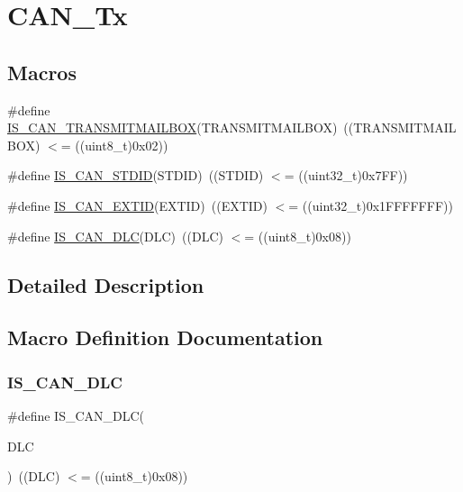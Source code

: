 \hypertarget{group___c_a_n___tx}{}\section{C\+A\+N\+\_\+\+Tx}
\label{group___c_a_n___tx}
\subsection*{Macros}
\begin{DoxyCompactItemize}
\item 
\#define \mbox{\hyperlink{group___c_a_n___tx_ga218b3e1380c4d49163c91a1af904e44c}{I\+S\+\_\+\+C\+A\+N\+\_\+\+T\+R\+A\+N\+S\+M\+I\+T\+M\+A\+I\+L\+B\+OX}}(T\+R\+A\+N\+S\+M\+I\+T\+M\+A\+I\+L\+B\+OX)~((T\+R\+A\+N\+S\+M\+I\+T\+M\+A\+I\+L\+B\+OX) $<$= ((uint8\+\_\+t)0x02))
\item 
\#define \mbox{\hyperlink{group___c_a_n___tx_gaf059e4383fa69dec6e18216b22a87f51}{I\+S\+\_\+\+C\+A\+N\+\_\+\+S\+T\+D\+ID}}(S\+T\+D\+ID)~((S\+T\+D\+ID) $<$= ((uint32\+\_\+t)0x7\+F\+F))
\item 
\#define \mbox{\hyperlink{group___c_a_n___tx_ga62dbc2163ad6751b3f921e717b00e9f2}{I\+S\+\_\+\+C\+A\+N\+\_\+\+E\+X\+T\+ID}}(E\+X\+T\+ID)~((E\+X\+T\+ID) $<$= ((uint32\+\_\+t)0x1\+F\+F\+F\+F\+F\+F\+F))
\item 
\#define \mbox{\hyperlink{group___c_a_n___tx_ga6109469a6a2792b3e7c6be520ea50d36}{I\+S\+\_\+\+C\+A\+N\+\_\+\+D\+LC}}(D\+LC)~((D\+LC) $<$= ((uint8\+\_\+t)0x08))
\end{DoxyCompactItemize}


\subsection{Detailed Description}


\subsection{Macro Definition Documentation}
\mbox{\label{group___c_a_n___tx_ga6109469a6a2792b3e7c6be520ea50d36}} 
\subsubsection{\texorpdfstring{IS\_CAN\_DLC}{IS\_CAN\_DLC}}
{\footnotesize\ttfamily \#define I\+S\+\_\+\+C\+A\+N\+\_\+\+D\+LC(\begin{DoxyParamCaption}\item[{}]{D\+LC }\end{DoxyParamCaption})~((D\+LC) $<$= ((uint8\+\_\+t)0x08))}

